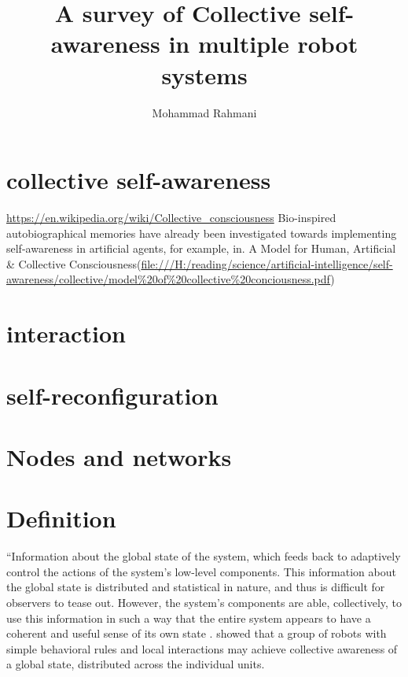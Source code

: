 \documentclass{article}
\begin{document}
	
	\title{A survey of Collective self-awareness in multiple robot systems}
	\author{Mohammad Rahmani}
	\date{}
	\maketitle
	\section{collective self-awareness}
	\cite{kanapram-2020-collective-awareness-for-abnormality-detection-in-connected-autonomous-vehicles}
	\cite{diaconescu-2017-architectures-for-collective-self-aware-computing-systems}
	\cite{kephart-2017-self-adaptation-in-collective-self-aware-computing-systems}
	\cite{baydoun-2020-prediction-of-multi-target-dynamics-using-discrete-descriptors-an-interactive-approach}
	\url{https://en.wikipedia.org/wiki/Collective_consciousness}
	Bio-inspired autobiographical memories have already
	been investigated towards implementing self-awareness in
	artificial agents, for example, in\cite{landauer-2015-designing-cooperating-self-improving-systems}.
	A Model for Human, Artificial \& Collective Consciousness(\url{file:///H:/reading/science/artificial-intelligence/self-awareness/collective/model\%20of\%20collective\%20conciousness.pdf})
	\section{interaction} 
	\citet{esterle-2020-i-think-therefore-you-are-models-for-interaction-in-collectives-of-self-aware-cyber-physical-systems}
	
	\section{self-reconfiguration}
		\cite{pena-2019-blockchain-powered-collaboration-in-heterogeneous-swarms-of-robots}
	
	
	
	\section{Nodes and networks}
		\cite{agne-2016-self-aware-compute-nodes}
	
	\section{Definition}
		“Information about the global state of the system, which feeds back to adaptively control the actions of the system’s low-level components. This information about the global state is distributed and statistical in nature, and thus is difficult for observers to tease out. However, the system’s components are able, collectively, to use this information in such a way that the entire system appears to have a coherent and useful sense of its own state \citep{mitchell-2005-self-awareness-and-control-in-decentralized-systems}. \cite{schmickl-2011-cocoro-the-self-aware-underwater-swarm} showed that a group of robots with simple behavioral rules
		and local interactions may achieve collective awareness of a global state, distributed across the individual units.
		
\end{document}
